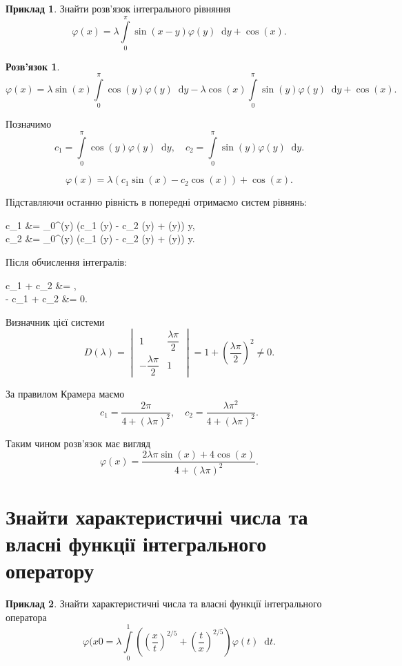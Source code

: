 \documentclass[a4paper, 12pt]{article}
\theoremstyle{definition}
\newtheorem*{example*}{Приклад}
\newtheorem*{solution*}{Розв'язок}
\newcommand{\Int}{\displaystyle\int\limits}
\newcommand*\diff{\mathop{}\!\mathrm{d}}
\renewcommand{\phi}{\varphi}
\newenvironment{system*}{\begin{equation*} \left\{\begin{aligned}}{\end{aligned} \right. \end{equation*}}
\begin{document}
\begin{example*}
	Знайти розв’язок інтегрального рівняння \[ \phi(x) = \lambda \Int_0^\pi \sin(x - y) \phi(y) \diff y + \cos(x). \]
\end{example*}

\begin{solution*}
	\[ \phi(x) = \lambda \sin(x) \Int_0^\pi \cos(y) \phi(y) \diff y - \lambda \cos(x) \Int_0^\pi \sin(y) \phi(y) \diff y + \cos(x). \]

	Позначимо \[ c_1 = \Int_0^\pi \cos(y) \phi(y) \diff y, \quad c_2 = \Int_0^\pi \sin(y) \phi(y) \diff y. \]

	\[ \phi(x) = \lambda (c_1 \sin(x) - c_2 \cos(x)) + \cos(x). \]
	
	Підставляючи останню рівність в попередні отримаємо систем рівнянь:
	\begin{system*}
		c_1 &= \Int_0^\pi \cos(y) (\lambda c_1 \sin(y) - \lambda c_2 \cos(y) + \cos(y)) \diff y, \\
		c_2 &= \Int_0^\pi \sin(y) (\lambda c_1 \sin(y) - \lambda c_2 \cos(y) + \cos(y)) \diff y.
	\end{system*}
	
	Після обчислення інтегралів:
	\begin{system*}
		c_1 +  c_2 &= \dfrac{\pi}{2}, \\
		-  c_1 + c_2 &= 0.
	\end{system*}

	Визначник цієї системи
	\[ D(\lambda) = \begin{vmatrix} 1 & \dfrac{\lambda\pi}{2} \\ -\dfrac{\lambda\pi}{2} & 1 \end{vmatrix} = 1 + \left( \dfrac{\lambda \pi}{2} \right)^2 \ne 0. \]
	
	За правилом Крамера маємо
	\[ c_1 = \dfrac{2 \pi}{4 + (\lambda \pi)^2}, \quad c_2 = \dfrac{\lambda \pi^2}{4 + (\lambda \pi)^2}. \]
	
	Таким чином розв’язок має вигляд
	\[ \phi(x) = \dfrac{2 \lambda \pi \sin(x) + 4 \cos (x)}{4 + (\lambda \pi)^2}. \]
\end{solution*}

\newpage

\section{Знайти характеристичні числа та власні функції інтегрального оператору}

\begin{example*}
	Знайти характеристичні числа та власні функції інтегрального оператора \[ \phi(x0 = \lambda \Int_0^1 \left( \left( \dfrac{x}{t} \right)^{2/5} + \left( \dfrac{t}{x} \right)^{2/5} \right) \phi(t) \diff t. \]
\end{example*}
\end{document}
